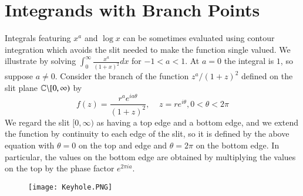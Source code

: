 \section{Integrands with Branch Points}


Integrals featuring $x^a$ and $\log x$ can be sometimes evaluated using contour integration which avoids the slit needed to make the function single valued. We illustrate by solving $\int_0^{\infty}\frac{x^a}{(1+x)^2}dx$ for $-1<a<1$. At $a = 0$ the integral is $1$, so suppose $a \neq 0$. Consider the branch of the function $z^a/(1+z)^2$ defined on the slit plane $\mathbb C\backslash[0,\infty)$ by \begin{equation*}
    f(z) = \frac{r^ae^{ia\theta}}{(1+z)^2},\;\;\;\;z=re^{i\theta},0<\theta<2\pi
\end{equation*}
We regard the slit $[0,\infty)$ as having a top edge and a bottom edge, and we extend the function by continuity to each edge of the slit, so it is defined by the above equation with $\theta = 0$ on the top and edge and $\theta = 2\pi$ on the bottom edge. In particular, the values on the bottom edge are obtained by multiplying the values on the top by the phase factor $e^{2\pi ia}$. 

\begin{wrapfigure}{r}{5.5cm}
    \texttt{[image: Keyhole.PNG]}
    \label{fig:key}
\end{wrapfigure}

